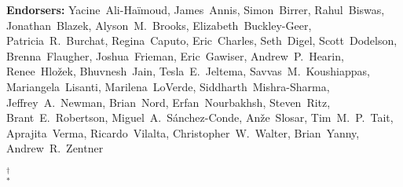\begin{raggedright}
\textbf{Endorsers:}
Yacine~Ali-Ha\"imoud,
James~Annis,
Simon~Birrer,
Rahul~Biswas,
Jonathan~Blazek,
Alyson~M.~Brooks,
Elizabeth~Buckley-Geer,
Patricia~R.~Burchat,
Regina~Caputo,
Eric~Charles,
Seth~Digel,
Scott~Dodelson,
Brenna~Flaugher,
Joshua~Frieman,
Eric~Gawiser,
Andrew~P.~Hearin,
Renee~Hlo\v{z}ek,
Bhuvnesh~Jain,
Tesla~E.~Jeltema,
Savvas~M.~Koushiappas,
Mariangela~Lisanti,
Marilena~LoVerde,
Siddharth~Mishra-Sharma,
Jeffrey~A.~Newman,
Brian~Nord,
Erfan~Nourbakhsh,
Steven~Ritz,
Brant~E.~Robertson,
Miguel~A.~S\'anchez-Conde,
An\v{z}e~Slosar,
Tim~M.~P.~Tait,
Aprajita~Verma,
Ricardo~Vilalta,
Christopher~W.~Walter,
Brian~Yanny,
Andrew~R.~Zentner


$^\dagger$  \\
$^*$ 

\begin{multicols}{2}
\scriptsize
\parskip=4pt



\end{multicols}
\end{raggedright}
